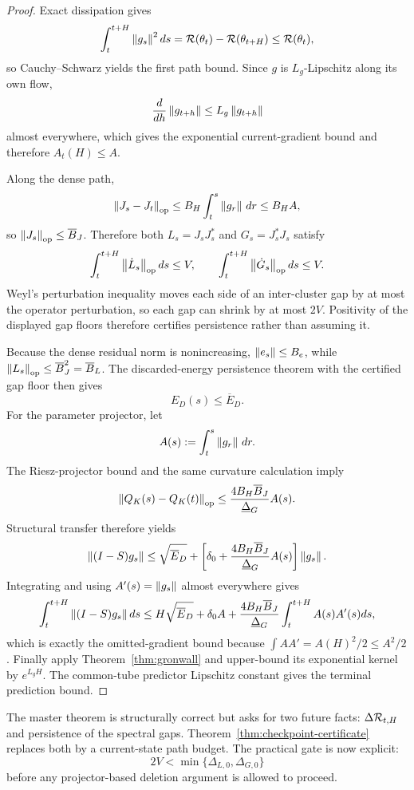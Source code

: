 \begin{proof}
Exact dissipation gives
\[
\int_t^{t+H}\left\lVert g_s\right\rVert^2ds
=\mathcal R(\theta_t)-\mathcal R(\theta_{t+H})
\le\mathcal R(\theta_t),
\]
so Cauchy--Schwarz yields the first path bound. Since $g$ is $L_g$-Lipschitz along its own flow,
\[
\frac{d}{dh}\left\lVert g_{t+h}\right\rVert
\le L_g\left\lVert g_{t+h}\right\rVert
\]
almost everywhere, which gives the exponential current-gradient bound and therefore $A_t(H)\le A$.

Along the dense path,
\[
\left\lVert J_s-J_t\right\rVert_{\mathrm{op}}
\le
B_H\int_t^s\left\lVert g_r\right\rVert\,dr
\le B_HA,
\]
so $\left\lVert J_s\right\rVert_{\mathrm{op}}\le\overline B_J$. Therefore both
$L_s=J_sJ_s^\ast$ and $G_s=J_s^\ast J_s$ satisfy
\[
\int_t^{t+H}\left\lVert \dot L_s\right\rVert_{\mathrm{op}}ds
\le V,
\qquad
\int_t^{t+H}\left\lVert \dot G_s\right\rVert_{\mathrm{op}}ds
\le V.
\]
Weyl's perturbation inequality moves each side of an inter-cluster gap by at most the operator perturbation, so each gap can shrink by at most $2V$. Positivity of the displayed gap floors therefore certifies persistence rather than assuming it.

Because the dense residual norm is nonincreasing, $\left\lVert e_s\right\rVert\le B_e$, while
$\left\lVert L_s\right\rVert_{\mathrm{op}}\le\overline B_J^2=\overline B_L$. The discarded-energy persistence theorem with the certified gap floor then gives
\[
E_D(s)\le\overline E_D.
\]
For the parameter projector, let
\[
A(s):=\int_t^s\left\lVert g_r\right\rVert\,dr.
\]
The Riesz-projector bound and the same curvature calculation imply
\[
\left\lVert Q_K(s)-Q_K(t)\right\rVert_{\mathrm{op}}
\le
\frac{4B_H\overline B_J}{\underline\Delta_G}A(s).
\]
Structural transfer therefore yields
\[
\left\lVert (I-S)g_s\right\rVert
\le
\sqrt{\overline E_D}
+\left[
\delta_0+
\frac{4B_H\overline B_J}{\underline\Delta_G}A(s)
\right]\left\lVert g_s\right\rVert.
\]
Integrating and using $A'(s)=\left\lVert g_s\right\rVert$ almost everywhere gives
\[
\int_t^{t+H}\left\lVert (I-S)g_s\right\rVert ds
\le
H\sqrt{\overline E_D}
+\delta_0A
+\frac{4B_H\overline B_J}{\underline\Delta_G}
\int_t^{t+H}A(s)A'(s)ds,
\]
which is exactly the omitted-gradient bound because
$\int A A'=A(H)^2/2\le A^2/2$.
Finally apply Theorem~\ref{thm:gronwall} and upper-bound its exponential kernel by $e^{L_gH}$. The common-tube predictor Lipschitz constant gives the terminal prediction bound.
\end{proof}

\begin{remark}
The master theorem is structurally correct but asks for two future facts: $\Delta\mathcal R_{t,H}$ and persistence of the spectral gaps. Theorem~\ref{thm:checkpoint-certificate} replaces both by a current-state path budget. The practical gate is now explicit:
\[
\boxed{
2V<\min\{\Delta_{L,0},\Delta_{G,0}\}
}
\]
before any projector-based deletion argument is allowed to proceed.
\end{remark}

